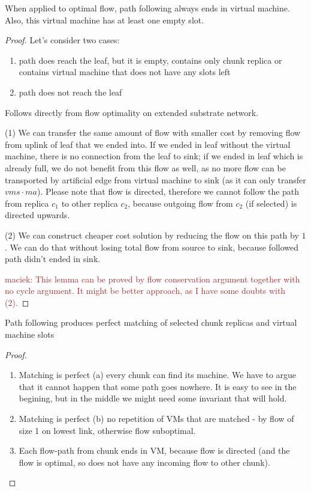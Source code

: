 \documentclass[9pt,twocolumn]{scrartcl}
\newcommand{\maciek}[1]{\textcolor{brown}{maciek: #1}}
\begin{document}
\begin{lemma}
  When applied to optimal flow, path following always ends in virtual machine. Also, this virtual machine has at least one empty slot.
\end{lemma}
\begin{proof}
  Let's consider two cases:
  \begin{enumerate}
    \item path does reach the leaf, but it is empty, contains only chunk replica or contains virtual machine that does not have any slots left
    \item path does not reach the leaf
  \end{enumerate}
 Follows directly from flow optimality on extended substrate network.
 
  (1) We can transfer the same amount of flow with smaller cost by removing flow from uplink of leaf that we ended into. If we ended in leaf without the virtual machine, there is no connection from the leaf to sink; if we ended in leaf which is already full, we do not benefit from this flow as well, as no more flow can be transported by artificial edge from virtual machine to sink (as it can only transfer $vms \cdot ma$). Please note that flow is directed, therefore we cannot follow the path from replica $c_1$ to other replica $c_2$, because outgoing flow from $c_2$ (if selected) is directed upwards.

  (2) We can construct cheaper cost solution by reducing the flow on this path by $1$. We can do that without losing total flow from source to sink, because followed path didn't ended in sink.

 \maciek{This lemma can be proved by flow conservation argument together with no cycle argument. It might be better approach, as I have some doubts with (2).}
\end{proof}

\begin{lemma}Path following produces perfect matching of selected chunk replicas and virtual machine slots
\end{lemma}
\begin{proof}
  \begin{enumerate}
\item  Matching is perfect (a) every chunk can find its machine. We have to argue that it cannot happen that some path goes nowhere. It is easy to see in the begining, but in the middle we might need some invariant that will hold.
  
\item Matching is perfect (b) no repetition of VMs that are matched - by flow of size 1 on lowest link, otherwise flow suboptimal.

  \item Each flow-path from chunk ends in VM, because flow is directed (and the flow is optimal, so does not have any incoming flow to other chunk).
  \end{enumerate}

\end{proof}
\end{document}
